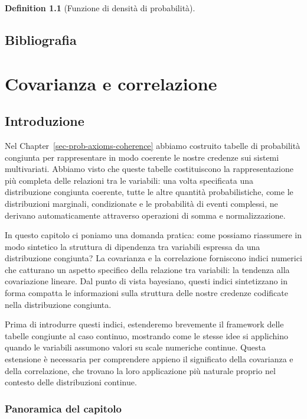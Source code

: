 \documentclass[
  letterpaper,
  DIV=11,
  numbers=noendperiod,
  oneside]{scrreprt}
\theoremstyle{definition}
\theoremstyle{plain}
\theoremstyle{definition}
\newtheorem{definition}{Definition}[chapter]
\theoremstyle{remark}
\begin{document}
\begin{definition}[Funzione di densità di
probabilità]
\begin{tcolorbox}
\end{tcolorbox}

\section*{Bibliografia}\label{bibliografia-5}


\chapter{Covarianza e correlazione}\label{sec-prob-cov-cor}

\section*{Introduzione}\label{introduzione-9}


Nel Chapter~\ref{sec-prob-axioms-coherence} abbiamo costruito tabelle di
probabilità congiunta per rappresentare in modo coerente le nostre
credenze sui sistemi multivariati. Abbiamo visto che queste tabelle
costituiscono la rappresentazione più completa delle relazioni tra le
variabili: una volta specificata una distribuzione congiunta coerente,
tutte le altre quantità probabilistiche, come le distribuzioni
marginali, condizionate e le probabilità di eventi complessi, ne
derivano automaticamente attraverso operazioni di somma e
normalizzazione.

In questo capitolo ci poniamo una domanda pratica: come possiamo
riassumere in modo sintetico la struttura di dipendenza tra variabili
espressa da una distribuzione congiunta? La covarianza e la correlazione
forniscono indici numerici che catturano un aspetto specifico della
relazione tra variabili: la tendenza alla covariazione lineare. Dal
punto di vista bayesiano, questi indici sintetizzano in forma compatta
le informazioni sulla struttura delle nostre credenze codificate nella
distribuzione congiunta.

Prima di introdurre questi indici, estenderemo brevemente il framework
delle tabelle congiunte al caso continuo, mostrando come le stesse idee
si applichino quando le variabili assumono valori su scale numeriche
continue. Questa estensione è necessaria per comprendere appieno il
significato della covarianza e della correlazione, che trovano la loro
applicazione più naturale proprio nel contesto delle distribuzioni
continue.

\subsection*{Panoramica del capitolo}\label{panoramica-del-capitolo-8}


\end{definition}
\end{document}
